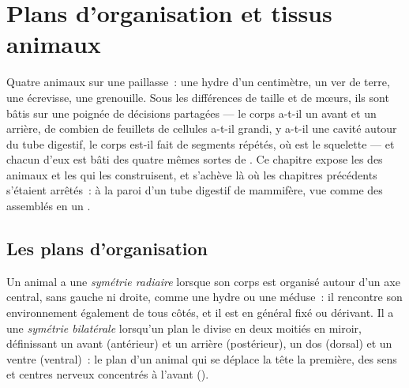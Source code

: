 \chapter{Plans d'organisation et tissus animaux}\label{ch:b1:body-plans-tissues}

Quatre animaux sur une paillasse~: une hydre d'un centimètre, un ver de
terre, une écrevisse, une grenouille. Sous les différences de taille et
de mœurs, ils sont bâtis sur une poignée de décisions partagées ---
le corps a-t-il un avant et un arrière, de combien de feuillets de
cellules a-t-il grandi, y a-t-il une cavité autour du tube digestif, le
corps est-il fait de segments répétés, où est le squelette --- et
chacun d'eux est bâti des quatre mêmes sortes de . Ce chapitre
expose les  des animaux et les  qui les
construisent, et s'achève là où les chapitres précédents s'étaient
arrêtés~: à la paroi d'un tube digestif de mammifère, vue comme des
 assemblés en un .

\section{Les plans d'organisation}

\begin{definition}\label{def:b1:body-plans-tissues:symmetry}
Un animal a une \emph{symétrie radiaire}
lorsque son corps est organisé autour d'un axe central, sans gauche ni
droite, comme une hydre ou une méduse~: il rencontre son environnement
également de tous côtés, et il est en général fixé ou dérivant. Il a une
\emph{symétrie bilatérale} lorsqu'un plan le
divise en deux moitiés en miroir, définissant un avant (antérieur) et un
arrière (postérieur), un dos (dorsal) et un ventre (ventral)~: le plan
d'un animal qui se déplace la tête la première,  des sens et
centres nerveux concentrés à l'avant ().
\end{definition}

